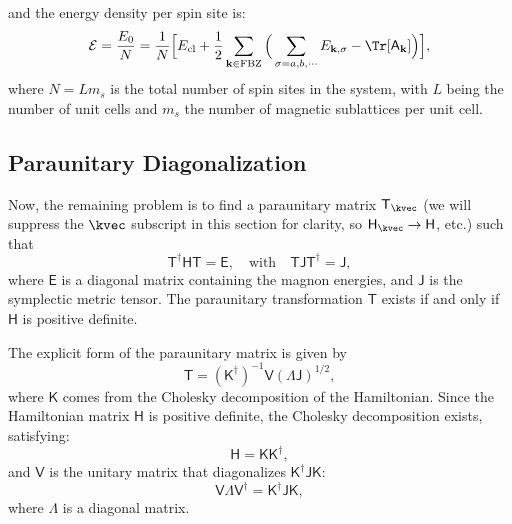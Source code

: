 and the energy density per spin site is:
\begin{equation}
    \mathcal{E} 
    = \frac{E_{0}}{N} 
    = \frac{1}{N} \Big[ E_{\rm cl} + \frac{1}{2} \sum_{\mathbf{k} \in \mathrm{FBZ}} \Big( \sum_{\sigma=a,b,\cdots} E_{\mathbf{k}, \sigma} -  \Tr[\mathsf{A}_{\mathbf{k}}] \Big) \Big],
\end{equation}
where $N=Lm_{s}$ is the total number of spin sites in the system, with $L$ being the number of unit cells and $m_s$ the number of magnetic sublattices per unit cell.



\subsection{Paraunitary Diagonalization}
Now, the remaining problem is to find a paraunitary matrix $\mathsf{T}_{\kvec}$ (we will suppress the $\kvec$ subscript in this section for clarity, so $\mathsf{H}_{\kvec} \rightarrow \mathsf{H}$, etc.) such that
\begin{equation}
    \mathsf{T}^{\dagger}\mathsf{HT} = \mathsf{E}, \quad \text{with}
    \quad \mathsf{TJT}^{\dagger} = \mathsf{J},
\end{equation}
where $\mathsf{E}$ is a diagonal matrix containing the magnon energies, and $\mathsf{J}$ is the symplectic metric tensor. The paraunitary transformation $\mathsf{T}$ exists if and only if $\mathsf{H}$ is positive definite.

The explicit form of the paraunitary matrix is given by 
\begin{equation}
    \mathsf{T} = (\mathsf{K}^{\dagger})^{-1} \mathsf{V} \mathsf{(\Lambda J)}^{1/2},
\end{equation}
where $\mathsf{K}$ comes from the Cholesky decomposition of the Hamiltonian. Since the Hamiltonian matrix $\mathsf{H}$ is positive definite, the Cholesky decomposition exists, satisfying:
\begin{equation}
    \mathsf{H} = \mathsf{KK}^{\dagger},
\end{equation}
and $\mathsf{V}$ is the unitary matrix that diagonalizes $\mathsf{K}^{\dagger} \mathsf{JK}$:
\begin{equation}
    \mathsf{V \Lambda V}^{\dagger} = \mathsf{K}^{\dagger} \mathsf{JK},
\end{equation}
where $\mathsf{\Lambda}$ is a diagonal matrix.

